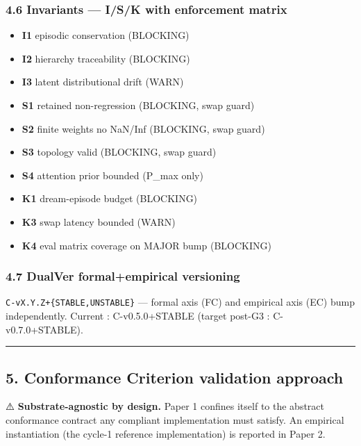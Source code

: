 \documentclass[
]{article}
\providecommand{\tightlist}{%
  \setlength{\itemsep}{0pt}\setlength{\parskip}{0pt}}
\begin{document}
\subsubsection{4.6 Invariants --- I/S/K with enforcement
matrix}\label{invariants-isk-with-enforcement-matrix}

\begin{itemize}
\tightlist
\item
  \textbf{I1} episodic conservation (BLOCKING)
\item
  \textbf{I2} hierarchy traceability (BLOCKING)
\item
  \textbf{I3} latent distributional drift (WARN)
\item
  \textbf{S1} retained non-regression (BLOCKING, swap guard)
\item
  \textbf{S2} finite weights no NaN/Inf (BLOCKING, swap guard)
\item
  \textbf{S3} topology valid (BLOCKING, swap guard)
\item
  \textbf{S4} attention prior bounded (P\_max only)
\item
  \textbf{K1} dream-episode budget (BLOCKING)
\item
  \textbf{K3} swap latency bounded (WARN)
\item
  \textbf{K4} eval matrix coverage on MAJOR bump (BLOCKING)
\end{itemize}

\subsubsection{4.7 DualVer formal+empirical
versioning}\label{dualver-formalempirical-versioning}

\texttt{C-vX.Y.Z+\{STABLE,UNSTABLE\}} --- formal axis (FC) and empirical
axis (EC) bump independently. Current : C-v0.5.0+STABLE (target post-G3
: C-v0.7.0+STABLE).

\begin{center}\rule{0.5\linewidth}{0.5pt}\end{center}

\subsection{5. Conformance Criterion validation
approach}\label{conformance-criterion-validation-approach}

⚠️ \textbf{Substrate-agnostic by design.} Paper 1 confines itself to the
abstract conformance contract any compliant implementation must satisfy.
An empirical instantiation (the cycle-1 reference implementation) is
reported in Paper 2.
\end{document}
